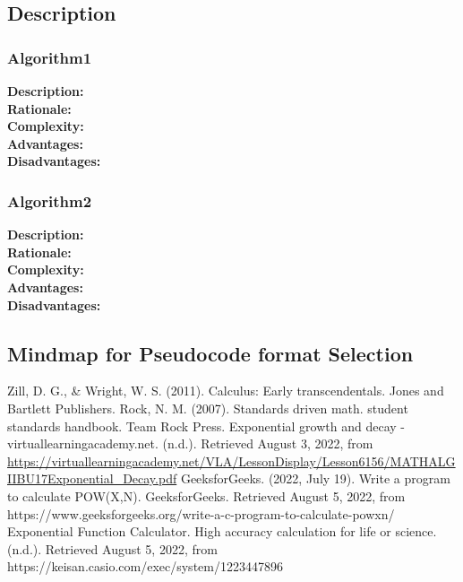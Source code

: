 \documentclass[a4paper,12pt]{report}
\begin{document}
\pagebreak

\subsection{Description}

\subsubsection{Algorithm1}

\textbf{ Description: }
\\\textbf{ Rationale: }
\\\textbf{ Complexity: }
\\\textbf{ Advantages: }
\\\textbf{ Disadvantages: }


\subsubsection{Algorithm2}

\textbf{ Description: }
\\\textbf{ Rationale: }
\\\textbf{ Complexity: }
\\\textbf{ Advantages: }
\\\textbf{ Disadvantages: }

\subsection{Mindmap for Pseudocode format Selection}




\begin{thebibliography}{9}
 Zill, D. G., \& Wright, W. S. (2011). Calculus: Early transcendentals. Jones and Bartlett Publishers.
 Rock, N. M. (2007). Standards driven math. student standards handbook. Team Rock Press.
Exponential growth and decay - virtuallearningacademy.net. (n.d.). Retrieved August 3, 2022, from  \url{https://virtuallearningacademy.net/VLA/LessonDisplay/Lesson6156/MATHALGIIBU17Exponential_Decay.pdf}
GeeksforGeeks. (2022, July 19). Write a program to calculate POW(X,N). GeeksforGeeks. Retrieved August 5, 2022, from https://www.geeksforgeeks.org/write-a-c-program-to-calculate-powxn/
Exponential Function Calculator. High accuracy calculation for life or science. (n.d.). Retrieved August 5, 2022, from https://keisan.casio.com/exec/system/1223447896
\end{thebibliography}
\end{document}
